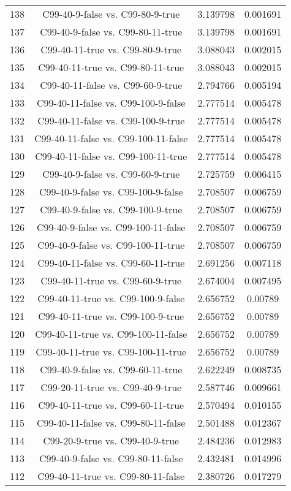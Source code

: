 \documentclass[a4paper,10pt]{article}
\begin{document}
\begin{landscape}
\begin{table}[!htp]
\begin{tabular}{cccc}
138&C99-40-9-false vs. C99-80-9-true&3.139798&0.001691\\
137&C99-40-9-false vs. C99-80-11-true&3.139798&0.001691\\
136&C99-40-11-true vs. C99-80-9-true&3.088043&0.002015\\
135&C99-40-11-true vs. C99-80-11-true&3.088043&0.002015\\
134&C99-40-11-false vs. C99-60-9-true&2.794766&0.005194\\
133&C99-40-11-false vs. C99-100-9-false&2.777514&0.005478\\
132&C99-40-11-false vs. C99-100-9-true&2.777514&0.005478\\
131&C99-40-11-false vs. C99-100-11-false&2.777514&0.005478\\
130&C99-40-11-false vs. C99-100-11-true&2.777514&0.005478\\
129&C99-40-9-false vs. C99-60-9-true&2.725759&0.006415\\
128&C99-40-9-false vs. C99-100-9-false&2.708507&0.006759\\
127&C99-40-9-false vs. C99-100-9-true&2.708507&0.006759\\
126&C99-40-9-false vs. C99-100-11-false&2.708507&0.006759\\
125&C99-40-9-false vs. C99-100-11-true&2.708507&0.006759\\
124&C99-40-11-false vs. C99-60-11-true&2.691256&0.007118\\
123&C99-40-11-true vs. C99-60-9-true&2.674004&0.007495\\
122&C99-40-11-true vs. C99-100-9-false&2.656752&0.00789\\
121&C99-40-11-true vs. C99-100-9-true&2.656752&0.00789\\
120&C99-40-11-true vs. C99-100-11-false&2.656752&0.00789\\
119&C99-40-11-true vs. C99-100-11-true&2.656752&0.00789\\
118&C99-40-9-false vs. C99-60-11-true&2.622249&0.008735\\
117&C99-20-11-true vs. C99-40-9-true&2.587746&0.009661\\
116&C99-40-11-true vs. C99-60-11-true&2.570494&0.010155\\
115&C99-40-11-false vs. C99-80-11-false&2.501488&0.012367\\
114&C99-20-9-true vs. C99-40-9-true&2.484236&0.012983\\
113&C99-40-9-false vs. C99-80-11-false&2.432481&0.014996\\
112&C99-40-11-true vs. C99-80-11-false&2.380726&0.017279\\

\end{tabular}
\end{table}
\end{landscape}
\end{document}
